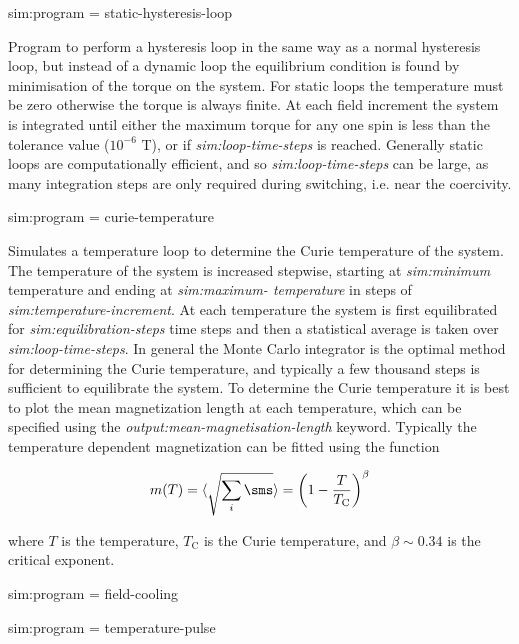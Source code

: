 {\zicf sim:program = static-hysteresis-loop} Program to perform a hysteresis loop in the same way as a normal hysteresis loop, but instead of a dynamic loop the equilibrium condition is found by minimisation of the torque on the system. For static loops the temperature must be zero otherwise the torque is always finite. At each field increment the system is integrated until either the maximum torque for any one spin is less than the tolerance value ($10^{-6}$ T), or if \textit{sim:loop-time-steps} is reached. Generally static loops are computationally efficient, and so \textit{sim:loop-time-steps} can be large, as many integration steps are only required during switching, i.e. near the coercivity.

{\zicf sim:program = curie-temperature} Simulates a temperature loop to determine the Curie temperature of the system. The temperature of the system is increased stepwise, starting at \textit{sim:minimum} temperature and ending at \textit{sim:maximum- temperature} in steps of \textit{sim:temperature-increment}. At each temperature the system is first equilibrated for \textit{sim:equilibration-steps} time steps and then a statistical average is taken over \textit{sim:loop-time-steps}. In general the Monte Carlo integrator is the optimal method for determining the Curie temperature, and typically a few thousand steps is sufficient to equilibrate the system. To determine the Curie temperature it is best to plot the mean magnetization length at each temperature, which can be specified using the \textit{output:mean-magnetisation-length} keyword. Typically the temperature dependent magnetization can be fitted using the function

\begin{equation}
m(T) = \langle{\sqrt{\sum_i \sms}}\rangle = \left(1 - \frac{T}{T_{\mathrm{C}}} \right)^{\beta}
\end{equation}

\noindent where $T$ is the temperature, $T_{\mathrm{C}}$ is the Curie temperature, and $\beta \sim 0.34$ is the critical exponent.

{\zicf sim:program = field-cooling}

{\zicf sim:program = temperature-pulse}

